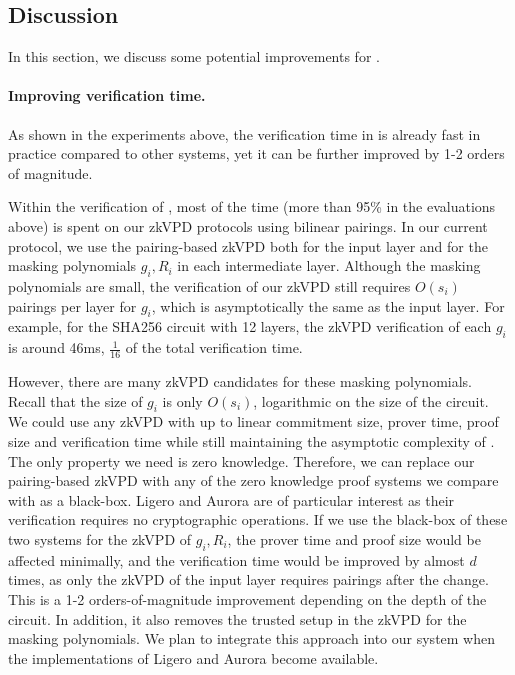 \subsection{Discussion}\label{subsec::discuss}

In this section, we discuss some potential improvements for \name.


\paragraph{Improving verification time.} As shown in the experiments above, the verification time in \name is already fast in practice compared to other systems, yet it can be further improved by 1-2 orders of magnitude. 

Within the verification of \name, most of the time (more than 95\% in the evaluations above) is spent on our zkVPD protocols using bilinear pairings. In our current protocol, we use the pairing-based zkVPD both for the input layer and for the masking polynomials $g_i, R_i$ in each intermediate layer. Although the masking polynomials are small, the verification of our zkVPD still requires $O(s_i)$ pairings per layer for $g_i$, which is asymptotically the same as the input layer. For example, for the SHA256 circuit with 12 layers, the zkVPD verification of each $g_i$ is around 46ms, $\frac{1}{16}$ of the total verification time.

However, there are many zkVPD candidates for these masking polynomials. Recall that the size of $g_i$ is only $O(s_i)$, logarithmic on the size of the circuit. We could use any zkVPD with up to linear commitment size, prover time, proof size and verification time while still maintaining the asymptotic complexity of \name. The only property we need is zero knowledge. Therefore, we can replace our pairing-based zkVPD with any of the zero knowledge proof systems we compare with as a black-box. Ligero and Aurora are of particular interest as their verification requires no cryptographic operations. If we use the black-box of these two systems for the zkVPD of $g_i, R_i$, the prover time and proof size would be affected minimally, and the verification time would be improved by almost $d$ times, as only the zkVPD of the input layer requires pairings after the change. This is a 1-2 orders-of-magnitude improvement depending on the depth of the circuit. In addition, it also removes the trusted setup in the zkVPD for the masking polynomials. We plan to integrate this approach into our system when the implementations of Ligero and Aurora become available.  


